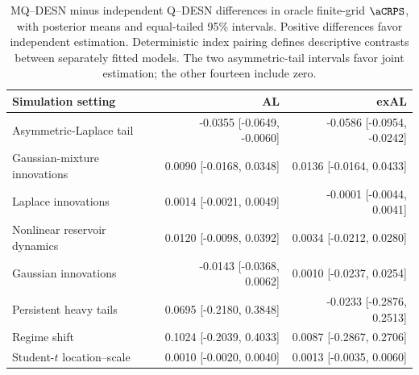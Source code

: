 \begin{table}[!htbp]
\centering
\footnotesize
\setlength{\tabcolsep}{3pt}
\renewcommand{\arraystretch}{1.08}
\begin{tabular}{@{}>{\raggedright\arraybackslash}p{}rr@{}}
\toprule
Simulation setting & AL & exAL \\
\midrule
Asymmetric-Laplace tail & -0.0355 [-0.0649, -0.0060] & -0.0586 [-0.0954, -0.0242] \\
Gaussian-mixture innovations & 0.0090 [-0.0168, 0.0348] & 0.0136 [-0.0164, 0.0433] \\
Laplace innovations & 0.0014 [-0.0021, 0.0049] & -0.0001 [-0.0044, 0.0041] \\
Nonlinear reservoir dynamics & 0.0120 [-0.0098, 0.0392] & 0.0034 [-0.0212, 0.0280] \\
Gaussian innovations & -0.0143 [-0.0368, 0.0062] & 0.0010 [-0.0237, 0.0254] \\
Persistent heavy tails & 0.0695 [-0.2180, 0.3848] & -0.0233 [-0.2876, 0.2513] \\
Regime shift & 0.1024 [-0.2039, 0.4033] & 0.0087 [-0.2867, 0.2706] \\
Student-\(t\) location--scale & 0.0010 [-0.0020, 0.0040] & 0.0013 [-0.0035, 0.0060] \\
\bottomrule
\end{tabular}
\caption{MQ--DESN minus independent Q--DESN differences in oracle finite-grid \(\aCRPS\), with posterior means and equal-tailed 95\% intervals. Positive differences favor independent estimation. Deterministic index pairing defines descriptive contrasts between separately fitted models. The two asymmetric-tail intervals favor joint estimation; the other fourteen include zero.}
\label{tab:joint-qdesn-pure-desn-v2-contrasts}
\end{table}
